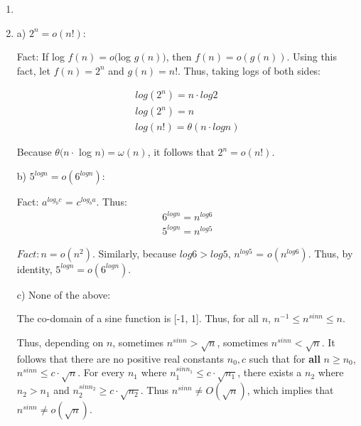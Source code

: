 \documentclass[a4paper]{report}
\begin{document}
\begin{enumerate}
    \par
    \bigskip
    \pagebreak
    \setcounter{equation}{0}
    
    \item 



    
    \bigskip
    \setcounter{equation}{0}

    \item 

      a) 
      $2^n = o(n!)$:

      Fact: If log $f(n) = o($log $g(n))$, then $f(n) = o(g(n))$. 
      Using this fact, let $f(n) = 2^n$ and $g(n) = n!$. Thus, taking logs of both sides:

      \begin{align}
        log(2^n) = n \cdot log 2 \\
        log(2^n) = n \\
        log(n!) = \theta(n \cdot log n) 
      \end{align}

      Because $\theta(n \cdot$ log $n) = \omega(n)$, it follows that $2^n = o(n!)$.

      \bigskip
      b) $5^{log n} = o(6^{log n})$:
      
      Fact: $a^{log_{b} c}$ = $c ^ {log_{b} a} $. Thus:
      \begin{align}
        6^{log n} = n^{log 6} \\
        5^{log n} = n^{log 5} 
      \end{align}

      $Fact: n = o(n^2)$. Similarly, because $log 6 > log 5$, $n^{log 5}$ = $o(n^{log 6})$. 
      Thus, by identity, $5^{log n} = o(6^{log n})$.

      \bigskip
      c) None of the above:
      
      The co-domain of a sine function is [-1, 1]. Thus, for all $n$, $n^{-1} \leq n^{sin n} \leq n$.

      Thus, depending on $n$, sometimes $n^{sin n} > \sqrt{n}$, sometimes $n^{sin n} < \sqrt{n}$.
      It follows that there are no positive real constants $n_{0}, c$ such that for {\bf all} $n \geq n_{0}$,  $n^{sin n} \leq c \cdot \sqrt{n}$.
      For every $n_{1}$ where $n_{1}^{sin n_{1}} \leq c \cdot \sqrt{n_{1}}$, there exists a $n_{2}$ where $n_{2} > n_{1}$ and $n_{2}^{sin n_{2}} \geq c \cdot \sqrt{n_{2}}$.
      Thus $n^{sin n} \neq O(\sqrt{n})$, which implies that $n^{sin n} \neq o(\sqrt{n})$.


\end{enumerate}
\end{document}
